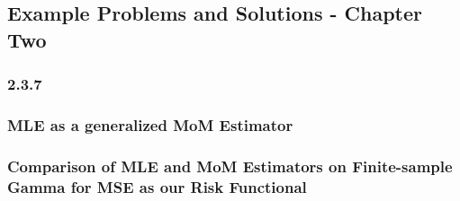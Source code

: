 	\subsection{Example Problems and Solutions - Chapter Two}

		\subsubsection{2.3.7}

		\subsubsection{MLE as a generalized MoM Estimator}

		\subsubsection{Comparison of MLE and MoM Estimators on Finite-sample Gamma for MSE as our Risk Functional}

			